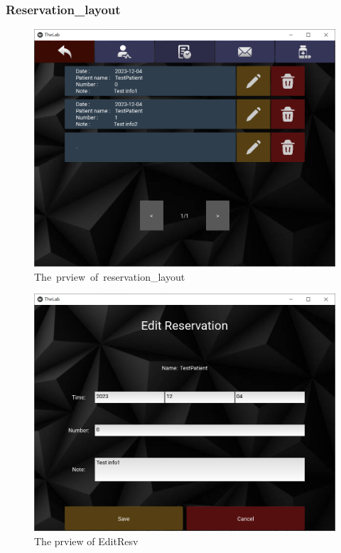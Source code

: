 \documentclass{article}
\begin{document}
\subsubsection*{Reservation\_layout}
\begin{figure}[h]
  \centering
  \includegraphics[scale = 0.5]{asset/doctor_gui/frontend_reservation_browse.png}
  \caption{The\ prview\ of\ reservation\_layout}
  \label{fig:frontend_reservation_browse}
\end{figure}

\begin{figure}[h]
  \centering
  \includegraphics[scale = 0.5]{asset/doctor_gui/frontend_reservation_edit.png}
  \caption{The prview of EditResv}
  \label{fig:frontend_reservation_edit}
\end{figure}
\end{document}
